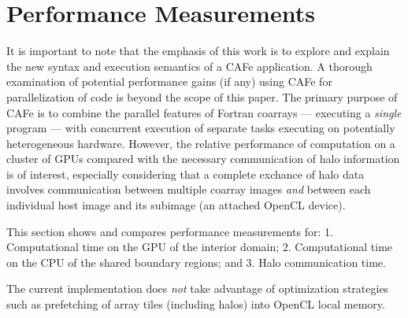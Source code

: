\section{Performance Measurements}

It is important to note that the emphasis of this work is to explore and explain the new
syntax and execution semantics of a CAFe application.  A thorough examination of potential
performance gains (if any) using CAFe for parallelization of code is beyond the scope of
this paper.  The primary purpose of CAFe is to combine the parallel features of Fortran coarrays
--- executing a \emph{single} program --- with concurrent execution of separate tasks executing on
potentially heterogeneous hardware.  However, the relative performance of computation on
a cluster of GPUs compared with the necessary communication of halo information is
of interest, especially considering that a complete exchance of halo data involves communication
between multiple
coarray images \emph{and} between each individual host image and its subimage (an attached
OpenCL device).


This section shows and compares performance measurements for: 1. Computational time on the GPU
of the interior domain;
2. Computational time on the CPU of the shared boundary regions; and 3. Halo communication time.


The current implementation does \emph{not} take advantage of optimization strategies such
as prefetching of array tiles (including halos) into OpenCL local memory.


\begin{comment}
Since many scientific codes are dominated by memory performance, including and especially
stencil algorithms as they typically only involve a computation on a small locally central
array element and a small overlapping halo region.  Stencil operations frequently do not
contain enough floating point operations per memory load to allow for floating point
performance to operate at peak (though this is entirely application and domain specific).
Thus we illustrate the \emph{potential} for performance by noting the latency and
throughput performance of an attached GPU in conjunction with MPI distributed memory
performance associated with halo transfer in Table 1.
\end{comment}

